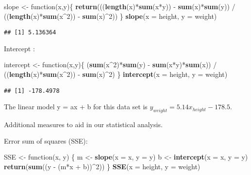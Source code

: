\documentclass[]{article}
\newenvironment{Shaded}{\begin{snugshade}}{\end{snugshade}}
\newcommand{\KeywordTok}[1]{\textcolor[rgb]{0.13,0.29,0.53}{\textbf{{#1}}}}
\newcommand{\DataTypeTok}[1]{\textcolor[rgb]{0.13,0.29,0.53}{{#1}}}
\newcommand{\DecValTok}[1]{\textcolor[rgb]{0.00,0.00,0.81}{{#1}}}
\newcommand{\StringTok}[1]{\textcolor[rgb]{0.31,0.60,0.02}{{#1}}}
\newcommand{\NormalTok}[1]{{#1}}
\begin{document}
\begin{Shaded}
\begin{Highlighting}[]
\NormalTok{slope <-}\StringTok{ }\NormalTok{function(x,y)\{}
\KeywordTok{return}\NormalTok{(((}\KeywordTok{length}\NormalTok{(x)*}\KeywordTok{sum}\NormalTok{(x*y)) -}\StringTok{ }\KeywordTok{sum}\NormalTok{(x)*}\KeywordTok{sum}\NormalTok{(y)) /}\StringTok{ }
\StringTok{       }\NormalTok{((}\KeywordTok{length}\NormalTok{(x)*}\KeywordTok{sum}\NormalTok{(x^}\DecValTok{2}\NormalTok{)) -}\StringTok{ }\KeywordTok{sum}\NormalTok{(x)^}\DecValTok{2}\NormalTok{))}
     \NormalTok{\}}
\KeywordTok{slope}\NormalTok{(}\DataTypeTok{x =} \NormalTok{height, }\DataTypeTok{y =} \NormalTok{weight)}
\end{Highlighting}
\end{Shaded}

\begin{verbatim}
## [1] 5.136364
\end{verbatim}

Intercept :

\begin{Shaded}
\begin{Highlighting}[]
\NormalTok{intercept <-}\StringTok{ }\NormalTok{function(x,y)\{}
  \NormalTok{(}\KeywordTok{sum}\NormalTok{(x^}\DecValTok{2}\NormalTok{)*}\KeywordTok{sum}\NormalTok{(y) -}\StringTok{ }\KeywordTok{sum}\NormalTok{(x*y)*}\KeywordTok{sum}\NormalTok{(x)) /}
\StringTok{  }\NormalTok{((}\KeywordTok{length}\NormalTok{(x)*}\KeywordTok{sum}\NormalTok{(x^}\DecValTok{2}\NormalTok{)) -}\StringTok{ }\KeywordTok{sum}\NormalTok{(x)^}\DecValTok{2}\NormalTok{)}
\NormalTok{\}}
\KeywordTok{intercept}\NormalTok{(}\DataTypeTok{x =} \NormalTok{height, }\DataTypeTok{y =} \NormalTok{weight)}
\end{Highlighting}
\end{Shaded}

\begin{verbatim}
## [1] -178.4978
\end{verbatim}

The linear model y = ax + b for this data set is
\(y_{weight} = 5.14x_{height} -178.5\).

Additional measures to aid in our statistical analysis.

Error sum of squares (SSE):

\begin{Shaded}
\begin{Highlighting}[]
\NormalTok{SSE <-}\StringTok{ }\NormalTok{function(x, y) \{}
    \NormalTok{m <-}\StringTok{ }\KeywordTok{slope}\NormalTok{(}\DataTypeTok{x =} \NormalTok{x, }\DataTypeTok{y =} \NormalTok{y)}
    \NormalTok{b <-}\StringTok{ }\KeywordTok{intercept}\NormalTok{(}\DataTypeTok{x =} \NormalTok{x, }\DataTypeTok{y =} \NormalTok{y)}
    \KeywordTok{return}\NormalTok{(}\KeywordTok{sum}\NormalTok{((y -}\StringTok{ }\NormalTok{(m*x +}\StringTok{ }\NormalTok{b))^}\DecValTok{2}\NormalTok{))}
\NormalTok{\}}
\KeywordTok{SSE}\NormalTok{(}\DataTypeTok{x =} \NormalTok{height, }\DataTypeTok{y =} \NormalTok{weight)}
\end{Highlighting}
\end{Shaded}
\end{document}
